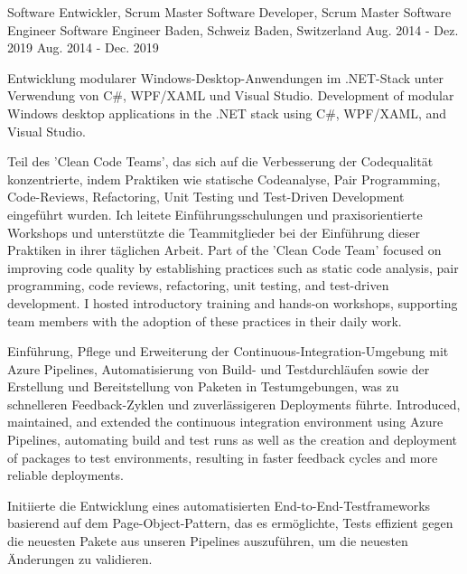 \begin{cventries}
	\cventry
	{
			{ Software Entwickler, Scrum Master	}
			{ Software Developer, Scrum Master }
	} %
	{
			{ Software Engineer }
			{ Software Engineer }
	} %
	{
			{ Baden, Schweiz }
			{ Baden, Switzerland }
	} %
	{
			{ Aug. 2014 - Dez. 2019 }
			{ Aug. 2014 - Dec. 2019 }
	} %
	{
		\begin{cvitems}
			\item {
				{
					Entwicklung modularer Windows-Desktop-Anwendungen im .NET-Stack unter Verwendung von C\#, WPF/XAML und Visual Studio.
				}
				{
					Development of modular Windows desktop applications in the .NET stack using C\#, WPF/XAML, and Visual Studio.
				}
			}
			\item{
				{
					Teil des 'Clean Code Teams', das sich auf die Verbesserung der Codequalität konzentrierte, indem Praktiken wie statische Codeanalyse, Pair Programming, Code-Reviews, Refactoring, Unit Testing und Test-Driven Development eingeführt wurden. Ich leitete Einführungsschulungen und praxisorientierte Workshops und unterstützte die Teammitglieder bei der Einführung dieser Praktiken in ihrer täglichen Arbeit.
				}
				{
					Part of the 'Clean Code Team' focused on improving code quality by establishing practices such as static code analysis, pair programming, code reviews, refactoring, unit testing, and test-driven development. I hosted introductory training and hands-on workshops, supporting team members with the adoption of these practices in their daily work.
				}
			}
			\item{
				{
					Einführung, Pflege und Erweiterung der Continuous-Integration-Umgebung mit Azure Pipelines, Automatisierung von Build- und Testdurchläufen sowie der Erstellung und Bereitstellung von Paketen in Testumgebungen, was zu schnelleren Feedback-Zyklen und zuverlässigeren Deployments führte.
				}
				{
					Introduced, maintained, and extended the continuous integration environment using Azure Pipelines, automating build and test runs as well as the creation and deployment of packages to test environments, resulting in faster feedback cycles and more reliable deployments.
				}
			}
			\item{
				{
					Initiierte die Entwicklung eines automatisierten End-to-End-Testframeworks basierend auf dem Page-Object-Pattern, das es ermöglichte, Tests effizient gegen die neuesten Pakete aus unseren Pipelines auszuführen, um die neuesten Änderungen zu validieren.
}}
\end{cvitems}}
\end{cventries}
